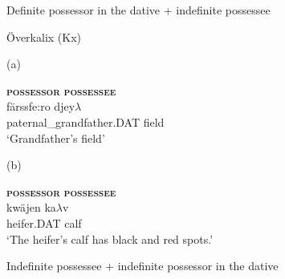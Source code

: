 \z

\item 

Definite possessor in the dative + indefinite possessee



\item 

Överkalix (Kx)



(a)

 \ea\label{}
\gll \textbf{\textsc{possessor}}  \textbf{\textsc{possessee}}\\

 \ea\label{}
\gll färssfe:ro  djey$\lambda $\\


paternal\_grandfather.DAT  field\\

\glt ‘Grandfather’s field’

\z

(b)

 \ea\label{}
\gll \textbf{\textsc{possessor}} \textbf{\textsc{possessee}}\\

 \ea\label{}
\gll kwäjen  ka$\lambda $v\\


heifer.DAT  calf\\

\glt ‘The heifer’s calf has black and red spots.’

\z

\item 

Indefinite possessee + indefinite possessor in the dative




